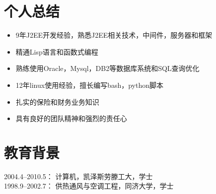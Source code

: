 \documentclass{res}
\begin{document}
 

\begin{CJK}{UTF8}{song}


\address{  \\东陆路1350弄21号501室\\201206 上海 中国\\0086-18101890138\\klose911@googlemail.com}

\begin{resume}

  \section{个人总结}
  \begin{itemize}
  \item 9年J2EE开发经验，熟悉J2EE相关技术，中间件，服务器和框架
  \item 精通Lisp语言和函数式编程
  \item 熟练使用Oracle，Mysql，DB2等数据库系统和SQL查询优化
  \item 12年linux使用经验，擅长编写bash，python脚本
  \item 扎实的保险和财务业务知识
  \item 具有良好的团队精神和强烈的责任心
  \end{itemize}


  \section{教育背景}          
  2004.4--2010.5：   \hfill 计算机，凯泽斯劳滕工大，学士 \\
  1998.9--2002.7：   \hfill 供热通风与空调工程，同济大学，学士



\end{resume}
\end{CJK}
\end{document}
